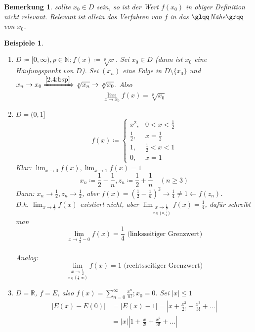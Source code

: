 \documentclass{extreport}
\newcommand{\N}{\mathbb{N}}
\newcommand{\R}{\mathbb{R}}
\theoremstyle{named}
\theoremstyle{dotless}
\newtheorem*{beispiele}{Beispiele}
\newtheorem*{bemerkung}{Bemerkung}
\begin{document}
\begin{bemerkung}
	sollte $x_{0} \in D$ sein, so ist der Wert $f(x_{0})$ in obiger Definition nicht relevant. Relevant ist allein das Verfahren von $f$ in das $\glqq$Nähe$\grqq$ von $x_{0}$.	
\end{bemerkung}

 
\begin{beispiele} ~\
	\begin{enumerate}
		\item $D \coloneqq [0, \infty), p \in \N; f(x) \coloneqq \sqrt[p]{x}$. Sei $x_{0} \in D$ (dann ist $x_{0}$ eine Häufungspunkt von $D$). Sei $(x_{n})$ eine Folge in $D \setminus \{ x_{0} \}$ und $x_{n} \rightarrow x_{0} \xRightarrow[]{\ref{2.4:bsp}} \sqrt[p]{x_{n}} \rightarrow \sqrt[p]{x_{0}}$. Also
			$$ \lim_{x \rightarrow x_{0}} f(x) = \sqrt[p]{x_{0}} $$
		\item $D = (0, 1]$
			$$ f(x) \coloneqq \begin{cases} x^{2}, & 0 < x < \frac{1}{2} \\ \frac{1}{2}, & x = \frac{1}{2} \\ 1, & \frac{1}{2} < x < 1 \\ 0, & x = 1 \end{cases} $$
			Klar: $\lim_{x \rightarrow 0} f(x), \lim_{x \rightarrow 1} f(x) = 1$
			$$ x_{n} \coloneqq \frac{1}{2} - \frac{1}{n}, z_{n} \coloneqq \frac{1}{2} + \frac{1}{n} \quad (n \geq 3) $$
			Dann: $x_{n} \rightarrow \frac{1}{2}, z_{n} \rightarrow \frac{1}{2}$, aber $f(x) = \left( \frac{1}{2} - \frac{1}{n} \right)^{2} \rightarrow \frac{1}{4} \neq 1 \leftarrow f(z_{n})$. \\
			D.h. $\lim_{x \rightarrow \frac{1}{2}} f(x)$ existiert nicht, aber $\lim_{\underset{x \in (0, \frac{1}{2})}{x \rightarrow \frac{1}{2}}} f(x) = \frac{1}{4}$, dafür schreibt man 
			$$ \lim_{x \rightarrow \frac{1}{2}-0} f(x) = \frac{1}{4} \text{ (linksseitiger Grenzwert)} $$ \\
			Analog: 
			$$ \lim_{\underset{x \in (\frac{1}{2}, \infty)}{x \rightarrow \frac{1}{2}}} f(x) = 1 \text{ (rechtsseitiger Grenzwert)} $$ 
		\item $D = \R$, $f = E$, also $f(x) = \sum_{n=0}^{\infty} \frac{x^{n}}{n!}; x_{0} = 0$. Sei $|x| \leq 1$
			\begin{align*}
				|E(x) - E(0)| & = |E(x) - 1| = |x + \frac{x^{2}}{2!} + \frac{x^{3}}{3!} + \dotsc | \\
				& = |x| \left| 1 + \frac{x}{2!} + \frac{x^{2}}{3!} + \dotsc \right| \\

\end{align*}
\end{enumerate}
\end{beispiele}
\end{document}
